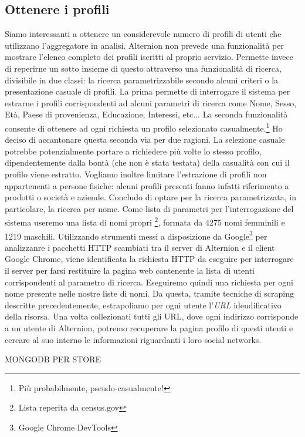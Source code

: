 \subsection{Ottenere i profili}
Siamo interessanti a ottenere un considerevole numero di profili di utenti che utilizzano l'aggregatore in analisi. Alternion non prevede una funzionalità per mostrare l'elenco completo dei profili iscritti al proprio servizio. Permette invece di reperirne un sotto insieme di questo attraverso una funzionalità di ricerca, divisibile in due classi: la ricerca parametrizzabile secondo alcuni criteri o la presentazione casuale di profili. La prima permette di interrogare il sistema per estrarne i profili corrispondenti ad alcuni parametri di ricerca come Nome, Sesso, Età, Paese di provenienza, Educazione, Interessi, etc... La seconda funzionalità consente di ottenere ad ogni richiesta un profilo selezionato casualmente.\footnote{Più probabilmente, pseudo-casualmente!} Ho deciso di accantonare questa seconda via per due ragioni. La selezione casuale potrebbe potenzialmente portare a richiedere più volte lo stesso profilo, dipendentemente dalla bontà (che non è stata testata) della casualità con cui il profilo viene estratto. Vogliamo inoltre limitare l'estrazione di profili non appartenenti a persone fisiche: alcuni profili presenti fanno infatti riferimento a prodotti o società e aziende. Concludo di optare per la ricerca parametrizzata, in particolare, la ricerca per nome. Come lista di parametri per l'interrogazione del sistema useremo una lista di nomi propri \footnote{Lista reperita da census.gov}, formata da 4275 nomi femminili e 1219 maschili. Utilizzando strumenti messi a disposizione da Google\footnote{Google Chrome DevTools} per analizzanre i pacchetti HTTP scambiati tra il server di Alternion e il client Google Chrome, viene identificata la richiesta HTTP da eseguire per interrogare il server per farsi restituire la pagina web contenente la lista di utenti corrispondenti al parametro di ricerca. Eseguiremo quindi una richiesta per ogni nome presente nelle nostre liste di nomi. Da questa, tramite tecniche di scraping descritte precedentemente, estrapoliamo per ogni utente l'\textit{URL} idendificativo della risorsa. Una volta collezionati tutti gli URL, dove ogni indirizzo corrisponde a un utente di Alternion, potremo recuperare la pagina profilo di questi utenti e cercare al suo interno le informazioni riguardanti i loro social networks.

MONGODB PER STORE
